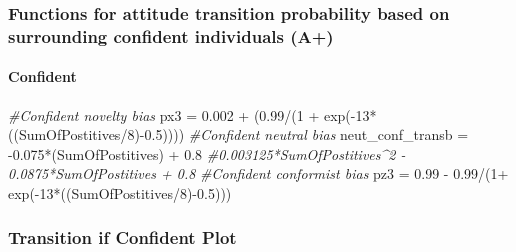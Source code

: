 \documentclass[
]{article}
\newenvironment{Shaded}{\begin{snugshade}}{\end{snugshade}}
\newcommand{\CommentTok}[1]{\textcolor[rgb]{0.56,0.35,0.01}{\textit{#1}}}
\newcommand{\DecValTok}[1]{\textcolor[rgb]{0.00,0.00,0.81}{#1}}
\newcommand{\FloatTok}[1]{\textcolor[rgb]{0.00,0.00,0.81}{#1}}
\newcommand{\FunctionTok}[1]{\textcolor[rgb]{0.00,0.00,0.00}{#1}}
\newcommand{\NormalTok}[1]{#1}
\newcommand{\OtherTok}[1]{\textcolor[rgb]{0.56,0.35,0.01}{#1}}
\newcommand{\SpecialCharTok}[1]{\textcolor[rgb]{0.00,0.00,0.00}{#1}}
\begin{document}
\hypertarget{functions-for-attitude-transition-probability-based-on-surrounding-confident-individuals-a}{%
\subsubsection{Functions for attitude transition probability based on
surrounding confident individuals
(A+)}\label{functions-for-attitude-transition-probability-based-on-surrounding-confident-individuals-a}}

\hypertarget{confident}{%
\paragraph{Confident}\label{confident}}

\begin{Shaded}
\begin{Highlighting}[]
\CommentTok{\#Confident novelty bias}
\NormalTok{px3 }\OtherTok{=} \FloatTok{0.002} \SpecialCharTok{+}\NormalTok{ (}\FloatTok{0.99}\SpecialCharTok{/}\NormalTok{(}\DecValTok{1} \SpecialCharTok{+} \FunctionTok{exp}\NormalTok{(}\SpecialCharTok{{-}}\DecValTok{13}\SpecialCharTok{*}\NormalTok{((SumOfPostitives}\SpecialCharTok{/}\DecValTok{8}\NormalTok{)}\SpecialCharTok{{-}}\FloatTok{0.5}\NormalTok{)))) }
\CommentTok{\#Confident neutral bias}
\NormalTok{neut\_conf\_transb }\OtherTok{=} \SpecialCharTok{{-}}\FloatTok{0.075}\SpecialCharTok{*}\NormalTok{(SumOfPostitives) }\SpecialCharTok{+} \FloatTok{0.8}
\CommentTok{\#0.003125*SumOfPostitives\^{}2 {-} 0.0875*SumOfPostitives + 0.8}
\CommentTok{\#Confident conformist bias}
\NormalTok{pz3 }\OtherTok{=} \FloatTok{0.99} \SpecialCharTok{{-}} \FloatTok{0.99}\SpecialCharTok{/}\NormalTok{(}\DecValTok{1}\SpecialCharTok{+} \FunctionTok{exp}\NormalTok{(}\SpecialCharTok{{-}}\DecValTok{13}\SpecialCharTok{*}\NormalTok{((SumOfPostitives}\SpecialCharTok{/}\DecValTok{8}\NormalTok{)}\SpecialCharTok{{-}}\FloatTok{0.5}\NormalTok{)))}
\end{Highlighting}
\end{Shaded}

\hypertarget{transition-if-confident-plot}{%
\subsubsection{Transition if Confident
Plot}\label{transition-if-confident-plot}}
\end{document}

